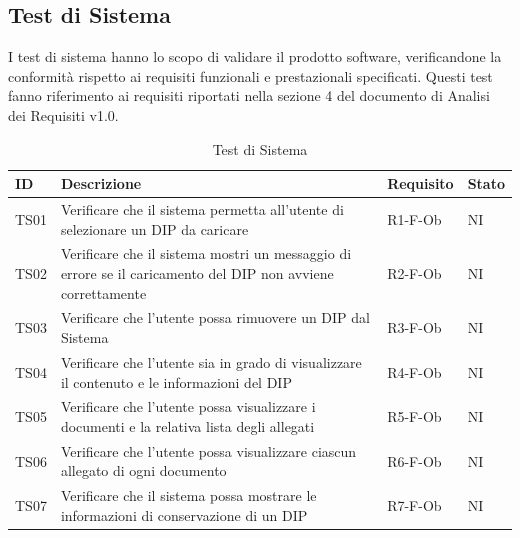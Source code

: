 \documentclass[a4paper,12pt]{article}
\begin{document}
        \subsection{Test di Sistema}

        I test di sistema hanno lo scopo di validare il prodotto software, verificandone la conformità rispetto ai requisiti funzionali e prestazionali specificati.
        Questi test fanno riferimento ai requisiti riportati nella sezione 4 del documento di Analisi dei Requisiti v1.0.

            \begin{longtable}{|M{1.2cm}|M{6.3cm}|M{2.5cm}|M{1.5cm}|}
                
                \caption{Test di Sistema} \\
                \hline
                \textbf{ID} & \textbf{Descrizione} & \textbf{Requisito} & \textbf{Stato} \\
                \hline
                \endhead

                TS01 & Verificare che il sistema permetta all'utente di selezionare un DIP da caricare& R1-F-Ob & NI \\
                \hline

                TS02 & Verificare che il sistema mostri un messaggio di errore se il caricamento del DIP non avviene correttamente & R2-F-Ob & NI \\
                \hline

                TS03 & Verificare che l'utente possa rimuovere un DIP dal Sistema & R3-F-Ob & NI \\
                \hline

                TS04 & Verificare che l'utente sia in grado di visualizzare il contenuto e le informazioni del DIP & R4-F-Ob & NI \\
                \hline

                TS05 & Verificare che l'utente possa visualizzare i documenti e la relativa lista degli allegati & R5-F-Ob & NI \\
                \hline

                TS06 & Verificare che l'utente possa visualizzare ciascun allegato di ogni documento & R6-F-Ob & NI \\
                \hline

                TS07 & Verificare che il sistema possa mostrare le informazioni di conservazione di un DIP & R7-F-Ob & NI \\
                \hline


\end{longtable}
\end{document}
